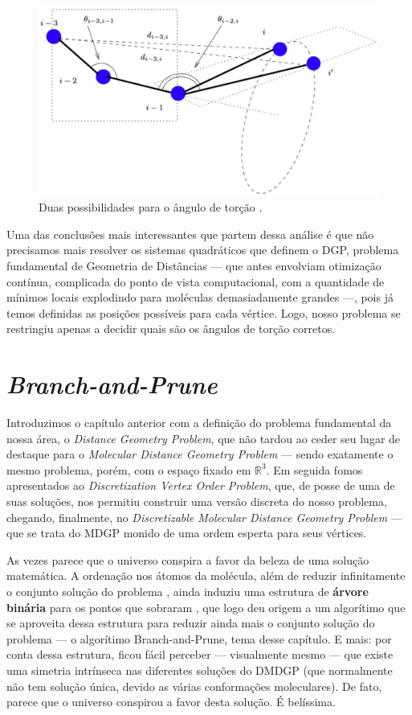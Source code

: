 \documentclass[a4paper,12pt]{article}
\begin{document}
 	\begin{figure}[H]
 		\begin{center}
 			\includegraphics[width=0.85\linewidth]{torcao.png}
 		\end{center}
 		\caption{Duas possibilidades para o ângulo de torção \cite{carlile:DMDGP}.}
 		\label{fig:torcao}
 	\end{figure}
 	
 	Uma das conclusões mais interessantes que partem dessa análise é que não precisamos mais resolver os sistemas quadráticos que definem o DGP, problema fundamental de Geometria de Distâncias --- que antes envolviam otimização contínua, complicada do ponto de vista computacional, com a quantidade de mínimos locais explodindo para moléculas demasiadamente grandes ---, pois já temos definidas as posições possíveis para cada vértice. Logo, nosso problema se restringiu apenas a decidir quais são os ângulos de torção corretos.
 	
	\newpage
	\section{\textit{Branch-and-Prune}}
	 Introduzimos o capítulo anterior com a definição do problema fundamental da nossa área, o \textit{Distance Geometry Problem}, que não tardou ao ceder seu lugar de destaque para o \textit{Molecular Distance Geometry Problem} --- sendo exatamente o mesmo problema, porém, com o espaço fixado em $\mathbb{R}^3$. Em seguida fomos apresentados ao \textit{Discretization Vertex Order Problem}, que, de posse de uma de suas soluções, nos permitiu construir uma versão discreta do nosso problema, chegando, finalmente, no \textit{Discretizable Molecular Distance Geometry Problem} --- que se trata do MDGP monido de uma ordem esperta para seus vértices.
	
	As vezes parece que o universo conspira a favor da beleza de uma solução matemática. A ordenação nos átomos da molécula, além de reduzir infinitamente o conjunto solução do problema \cite{carlileBook31Coloquio}, ainda induziu uma estrutura de \textbf{árvore binária} para os pontos que sobraram \cite{fidalgotese}, que logo deu origem a um algorítimo que se aproveita dessa estrutura para reduzir ainda mais o conjunto solução do problema --- o algorítimo Branch-and-Prune, tema desse capítulo. E mais: por conta dessa estrutura, ficou fácil perceber --- visualmente mesmo --- que existe uma simetria intrínseca nas diferentes soluções do DMDGP (que normalmente não tem solução única, devido as várias conformações moleculares). De fato, parece que o universo conspirou a favor desta solução. É belíssima.
	
\end{document}
